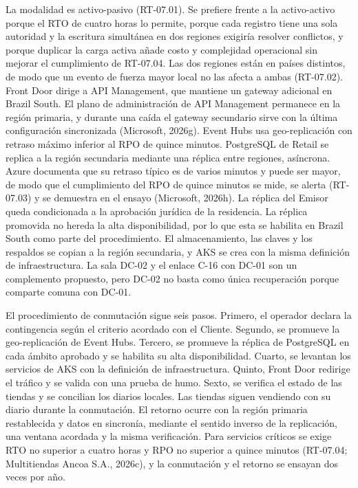 \documentclass[11pt]{article}
\begin{document}
La modalidad es activo-pasivo (RT-07.01). Se prefiere frente a la activo-activo porque el RTO de cuatro horas lo permite, porque cada registro tiene una sola autoridad y la escritura simultánea en dos regiones exigiría resolver conflictos, y porque duplicar la carga activa añade costo y complejidad operacional sin mejorar el cumplimiento de RT-07.04. Las dos regiones están en países distintos, de modo que un evento de fuerza mayor local no las afecta a ambas (RT-07.02). Front Door dirige a API Management, que mantiene un gateway adicional en Brazil South. El plano de administración de API Management permanece en la región primaria, y durante una caída el gateway secundario sirve con la última configuración sincronizada (Microsoft, 2026g). Event Hubs usa geo-replicación con retraso máximo inferior al RPO de quince minutos. PostgreSQL de Retail se replica a la región secundaria mediante una réplica entre regiones, asíncrona. Azure documenta que su retraso típico es de varios minutos y puede ser mayor, de modo que el cumplimiento del RPO de quince minutos se mide, se alerta (RT-07.03) y se demuestra en el ensayo (Microsoft, 2026h). La réplica del Emisor queda condicionada a la aprobación jurídica de la residencia. La réplica promovida no hereda la alta disponibilidad, por lo que esta se habilita en Brazil South como parte del procedimiento. El almacenamiento, las claves y los respaldos se copian a la región secundaria, y AKS se crea con la misma definición de infraestructura. La sala DC-02 y el enlace C-16 con DC-01 son un complemento propuesto, pero DC-02 no basta como única recuperación porque comparte comuna con DC-01.

El procedimiento de conmutación sigue seis pasos. Primero, el operador declara la contingencia según el criterio acordado con el Cliente. Segundo, se promueve la geo-replicación de Event Hubs. Tercero, se promueve la réplica de PostgreSQL en cada ámbito aprobado y se habilita su alta disponibilidad. Cuarto, se levantan los servicios de AKS con la definición de infraestructura. Quinto, Front Door redirige el tráfico y se valida con una prueba de humo. Sexto, se verifica el estado de las tiendas y se concilian los diarios locales. Las tiendas siguen vendiendo con su diario durante la conmutación. El retorno ocurre con la región primaria restablecida y datos en sincronía, mediante el sentido inverso de la replicación, una ventana acordada y la misma verificación. Para servicios críticos se exige RTO no superior a cuatro horas y RPO no superior a quince minutos (RT-07.04; Multitiendas Ancoa S.A., 2026c), y la conmutación y el retorno se ensayan dos veces por año.
\end{document}
